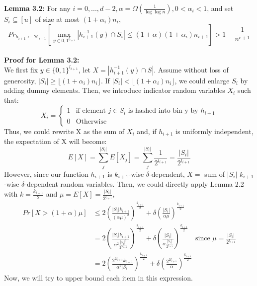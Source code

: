 \documentclass[letterpaper]{article} %
\begin{document}
	\noindent\textbf{Lemma 3.2:} For any $i = {0,...,d-2},\alpha = \Omega(\frac1{\log\log n}), 0<\alpha_i<1$, and set $S_i\subseteq[u]$ of size at most $(1+\alpha_i)n_i$,
	$${Pr}_{h_{i+1}\leftarrow \mathscr{H}_{i+1}}\left[\max_{y\in{0,1}^{l_{i+1}}}|h_{i+1}^{-1}(y) \cap S_i|\le(1+\alpha)(1+\alpha_i)n_{i+1}\right]> 1-\frac1{n^{c+1}}$$
	\\
	\noindent\textbf{Proof for Lemma 3.2:} \\
	We first fix $y\in\{0,1\}^{l_{i+1}}$, let $X=|h_{i+1}^{-1}(y)\cap S|$. Assume without loss of generosity, $|S_i|\ge \lfloor (1+\alpha_i)n_i\rfloor$. If $|S_i|< \lfloor (1+\alpha_i)n_i\rfloor$, we could enlarge $S_i$ by adding dummy elements. Then, we introduce indicator random variables $X_i$ such that:
\[ X_i=\begin{cases} 
      1 & \text{if element }j\in S_i\text{ is hashed into bin y by }h_{i+1} \\
      0 & \text{Otherwise}
   \end{cases}
\]
	Thus, we could rewrite X as the sum of $X_i$ and, if $h_{i+1}$ is uniformly independent, the expectation of X will become:
	$$E[X] = \sum_j^{|S_i|}E[X_j]=\sum_j^{|S_i|}\frac1{2^{l_{i+1}}} = \frac{|S_i|}{2^{l_{i+1}}}$$
	However, since our function $h_{i+1}$ is $k_{i+1}$-wise $\delta$-dependent, $X=$ sum of $|S_i|$ $k_{i+1}$-wise $\delta$-dependent random variables. Then, we could directly apply Lemma 2.2 with $k = \frac{k_{i+1}}2$ and $\mu =E[X]=\frac{|S_i|}{2^{l_{i+1}}}$,
	\begin{align*}
	Pr[X>(1+\alpha)\mu] &\le 2\left(\frac{|S_i|k_{i+1}}{(\alpha\mu)^2}\right)^{\frac{k_{i+1}}2}+\delta\left( \frac{|S_i|}{\alpha\mu}\right)^{\frac{k_{i+1}}2}\\
	&= 2\left(\frac{|S_i|k_{i+1}}{\alpha^2 \frac{|S_i|^2}{2^{2l_{i+1}}}}\right)^{\frac{k_{i+1}}2} +\delta\left( \frac{|S_i|}{\alpha\frac{|S_i|}{2^{l_{i+1}}}}\right)^{\frac{k_{i+1}}2}\quad\text{since }\mu =\frac{|S_i|}{2^{l_{i+1}}}\\
	&= 2\left(\frac{2^{2l_{i+1}}k_{i+1}}{\alpha^2 |S_i|}\right)^{\frac{k_{i+1}}2} +\delta\left( \frac{2^{2l_{i+1}}}{\alpha}\right)^{\frac{k_{i+1}}2}
	\end{align*}
	Now, we will try to upper bound each item in this expression.
\end{document}

